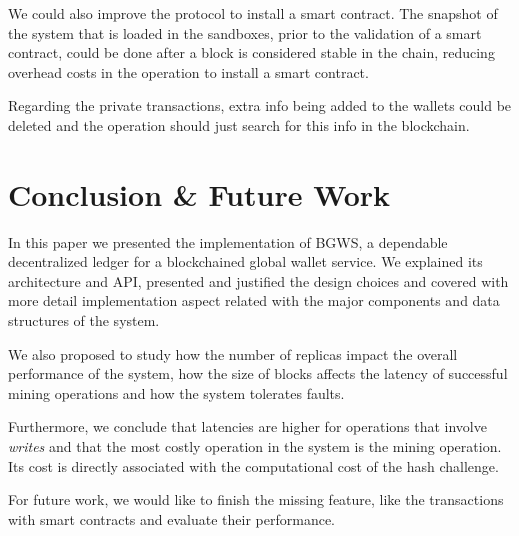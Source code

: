 \documentclass[10pt,journal,compsoc]{IEEEtran}
\begin{document}
	We could also improve the protocol to install a smart contract. The snapshot of the system that is loaded in the sandboxes, prior to the validation of a smart contract, could be done after a block is considered stable in the chain, reducing overhead costs in the operation to install a smart contract.

	Regarding the private transactions, extra info being added to the wallets could be deleted and the operation should just search for this info in the blockchain.

	
	\section{Conclusion \& Future Work}

	In this paper we presented the implementation of BGWS, a dependable decentralized ledger for a blockchained global wallet service. We explained its architecture and API, presented and justified the design choices and covered with more detail implementation aspect related with the major components and data structures of the system. 

	We also proposed to study how the number of replicas impact the overall performance of the system, how the size of blocks affects the latency of successful mining operations and how the system tolerates faults.

	Furthermore, we conclude that latencies are higher for operations that involve \textit{writes} and that the most costly operation in the system is the mining operation. Its cost is directly associated with the computational cost of the hash challenge. 

	For future work, we would like to finish the missing feature, like the transactions with smart contracts and evaluate their performance. 

	\ifCLASSOPTIONcaptionsoff
	\newpage
	\fi
	
	
	
\end{document}
